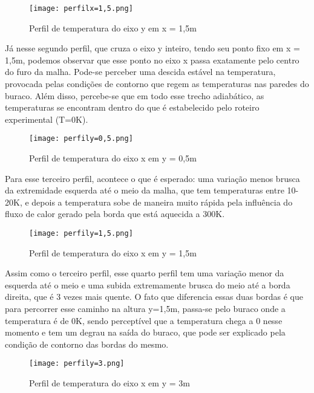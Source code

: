 \documentclass[article]{abntex2}
\begin{document}
\begin{figure}[H]
    \begin{center}       
        \texttt{[image: perfilx=1,5.png]} 
        \caption{Perfil de temperatura do eixo y em x = 1,5m}
    \end{center}
\end{figure}



Já nesse segundo perfil, que cruza o eixo y inteiro, tendo seu ponto fixo em x = 1,5m, podemos observar que esse ponto no eixo x passa exatamente pelo centro do furo da malha. Pode-se perceber uma descida estável na temperatura, provocada pelas condições de contorno que regem as temperaturas nas paredes do buraco. Além disso, percebe-se que em todo esse trecho adiabático, as temperaturas se encontram dentro do que é estabelecido pelo roteiro experimental (T=0K).

\begin{figure}[H]
    \begin{center}       
        \texttt{[image: perfily=0,5.png]} 
        \caption{Perfil de temperatura do eixo x em y = 0,5m}
    \end{center}
\end{figure}

    
Para esse terceiro perfil, acontece o que é esperado: uma variação menos brusca da extremidade esquerda até o meio da malha, que tem temperaturas entre 10-20K, e depois a temperatura sobe de maneira muito rápida pela influência do fluxo de calor gerado pela borda que está aquecida a 300K.

\begin{figure}[H]
    \begin{center}
        \texttt{[image: perfily=1,5.png]} 
        \caption{Perfil de temperatura do eixo x em y = 1,5m}
    \end{center}
\end{figure}


Assim como o terceiro perfil, esse quarto perfil tem uma variação menor da esquerda até o meio e uma subida extremamente brusca do meio até a borda direita, que é 3 vezes mais quente. O fato que diferencia essas duas bordas é que para percorrer esse caminho na altura y=1,5m, passa-se pelo buraco onde a temperatura é de 0K, sendo perceptível que a temperatura chega a 0 nesse momento e tem um degrau na saída do buraco, que pode ser explicado pela condição de contorno das bordas do mesmo.

    \begin{figure}[H]
        \begin{center}
        \texttt{[image: perfily=3.png]} 
        \caption{Perfil de temperatura do eixo x em y = 3m}
    \end{center}
\end{figure}
\end{document}
